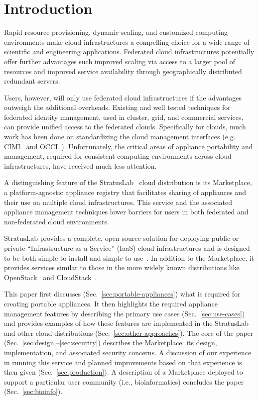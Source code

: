 \section{Introduction}
\label{sec:Introduction}

Rapid resource provisioning, dynamic scaling, and customized computing
environments make cloud infrastructures a compelling choice for a wide
range of scientific and engineering applications.  Federated cloud
infrastructures potentially offer further advantages such improved
scaling via access to a larger pool of resources and improved service
availability through geographically distributed redundant servers.

Users, however, will only use federated cloud infrastructures if the
advantages outweigh the additional overheads.  Existing and well
tested techniques for federated identity management, used in cluster,
grid, and commercial services, can provide unified access to the
federated clouds.  Specifically for clouds, much work has been done on
standardizing the cloud management interfaces (e.g. CIMI~\cite{cimi}
and OCCI~\cite{occi}).  Unfortunately, the critical areas of appliance
portability and management, required for consistent computing
environments across cloud infrastructures, have received much less
attention.

A distinguishing feature of the StratusLab~\cite{slbook} cloud
distribution is its Marketplace, a platform-agnostic appliance
registry that facilitates sharing of appliances and their use on
multiple cloud infrastructures.  This service and the associated
appliance management techniques lower barriers for users in both
federated and non-federated cloud environments.

StratusLab provides a complete, open-source solution for deploying
public or private ``Infrastructure as a Service'' (IaaS) cloud
infrastructures and is designed to be both simple to install and
simple to use~\cite{slbook}.  In addition to the Marketplace, it
provides services similar to those in the more widely known
distributions like OpenStack~\cite{openstack} and
CloudStack~\cite{cloudstack}.

This paper first discusses (Sec.~\ref{sec:portable-appliances}) what
is required for creating portable appliances. It then highlights the
required appliance management features by describing the primary use
cases (Sec.~\ref{sec:use-cases}) and provides examples of how these
features are implemented in the StratusLab and other cloud
distributions (Sec.~\ref{sec:other-approaches}).  The core of the
paper (Sec.~\ref{sec:design}--\ref{sec:security}) describes the
Marketplace: its design, implementation, and associated security
concerns.  A discussion of our experience in running this service and
planned improvements based on that experience is then given
(Sec.~\ref{sec:production}). A description of a Marketplace deployed
to support a particular user community (i.e., bioinformatics)
concludes the paper (Sec.~\ref{sec:bioinfo}).
